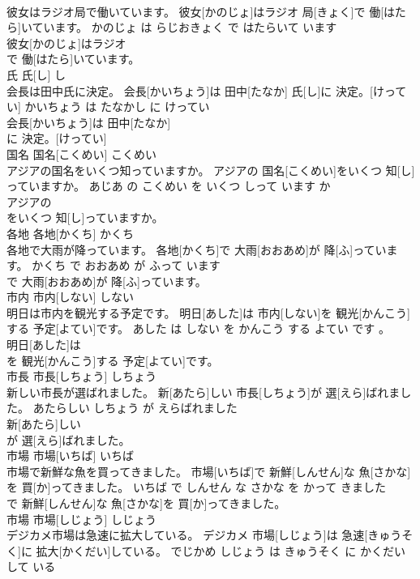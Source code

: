 \documentclass[8pt]{extreport}
\begin{document}
\begin{CJK}{UTF8}{min}
\\	彼女はラジオ局で働いています。	彼女[かのじょ]はラジオ 局[きょく]で 働[はたら]いています。	かのじょ は らじおきょく で はたらいて います	
\\	彼女[かのじょ]はラジオ
\\	で 働[はたら]いています。			
\\	氏	氏[し]	し	
\\	会長は田中氏に決定。	会長[かいちょう]は 田中[たなか] 氏[し]に 決定。[けってい]	かいちょう は たなかし に けってい	
\\	会長[かいちょう]は 田中[たなか]
\\	に 決定。[けってい]			
\\	国名	国名[こくめい]	こくめい	
\\	アジアの国名をいくつ知っていますか。	アジアの 国名[こくめい]をいくつ 知[し]っていますか。	あじあ の こくめい を いくつ しって います か	
\\	アジアの
\\	をいくつ 知[し]っていますか。			
\\	各地	各地[かくち]	かくち	
\\	各地で大雨が降っています。	各地[かくち]で 大雨[おおあめ]が 降[ふ]っています。	かくち で おおあめ が ふって います	
\\	で 大雨[おおあめ]が 降[ふ]っています。			
\\	市内	市内[しない]	しない	
\\	明日は市内を観光する予定です。	明日[あした]は 市内[しない]を 観光[かんこう]する 予定[よてい]です。	あした は しない を かんこう する よてい です 。	
\\	明日[あした]は
\\	を 観光[かんこう]する 予定[よてい]です。			
\\	市長	市長[しちょう]	しちょう	
\\	新しい市長が選ばれました。	新[あたら]しい 市長[しちょう]が 選[えら]ばれました。	あたらしい しちょう が えらばれました	
\\	新[あたら]しい
\\	が 選[えら]ばれました。			
\\	市場	市場[いちば]	いちば	
\\	市場で新鮮な魚を買ってきました。	市場[いちば]で 新鮮[しんせん]な 魚[さかな]を 買[か]ってきました。	いちば で しんせん な さかな を かって きました	
\\	で 新鮮[しんせん]な 魚[さかな]を 買[か]ってきました。			
\\	市場	市場[しじょう]	しじょう	
\\	デジカメ市場は急速に拡大している。	デジカメ 市場[しじょう]は 急速[きゅうそく]に 拡大[かくだい]している。	でじかめ しじょう は きゅうそく に かくだい して いる	

\end{CJK}
\end{document}
